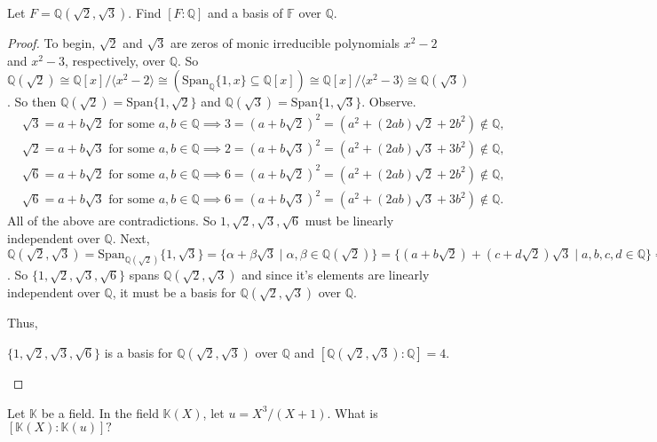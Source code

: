 \documentclass[addpoints,10pt]{exam}
\theoremstyle{plain}
\theoremstyle{definition}
\newtheorem{prob}[thm]{Problem}
\theoremstyle{plain}
\theoremstyle{plain}
\theoremstyle{definition}
\let\oldprob\prob
\let\endoldprob\endprob
\renewenvironment{prob}
  {\begin{singlespace}\oldprob}
  {\endoldprob\end{singlespace}}
\newcommand{\FF}{\ensuremath{\mathbb{F}}}
\newcommand{\KK}{\ensuremath{\mathbb{K}}}
\newcommand{\QQ}{\ensuremath{\mathbb{Q}}}
\begin{document}
\newpage
\begin{prob}
Let $F = \mathbb{Q}(\sqrt{2}, \sqrt{3})$. Find $[F:\mathbb{Q}]$ and a basis of $\FF$ over $\mathbb{Q}$.
\end{prob}

\begin{proof}
To begin, $\sqrt{2}$ and $\sqrt{3}$ are zeros of monic irreducible polynomials $x^{2}-2$ and $x^{2}-3$, respectively, over $\QQ$. So $\QQ(\sqrt{2})\cong \QQ[x]/\langle x^{2}-2\rangle\cong (\mathrm{Span}_{\QQ}\{1,x\}\subseteq \QQ[x]) \cong \QQ[x]/\langle x^{2}-3\rangle \cong \QQ(\sqrt{3})$. So then $\QQ(\sqrt{2})=\mathrm{Span}\{1,\sqrt{2}\}$ and $\QQ(\sqrt{3})=\mathrm{Span}\{1,\sqrt{3}\}$. Observe. 
\begin{align*}
  &\sqrt{3}=a+b\sqrt{2}\text{ for some }a,b\in \QQ \implies 3=(a+b\sqrt{2})^{2}=(a^{2}+(2ab)\sqrt{2}+2b^{2})\not\in \QQ,\\
  &\sqrt{2}=a+b\sqrt{3}\text{ for some }a,b\in \QQ\implies 2=(a+b\sqrt{3})^{2}=(a^{2}+(2ab)\sqrt{3}+3b^{2})\not\in \QQ,\\
  &\sqrt{6}=a+b\sqrt{2}\text{ for some }a,b\in \QQ\implies 6=(a+b\sqrt{2})^{2}=(a^{2}+(2ab)\sqrt{2}+2b^{2})\not\in \QQ,\\
  &\sqrt{6}=a+b\sqrt{3}\text{ for some }a,b\in \QQ\implies 6=(a+b\sqrt{3})^{2}=(a^{2}+(2ab)\sqrt{3}+3b^{2})\not\in \QQ.
\end{align*}
  All of the above are contradictions. So $1,\sqrt{2},\sqrt{3},\sqrt{6}$ must be linearly independent over $\QQ$. Next, $\QQ(\sqrt{2},\sqrt{3})=\mathrm{Span}_{\QQ(\sqrt{2})}\{1,\sqrt{3}\}=\{\alpha+\beta\sqrt{3}\mid \alpha,\beta\in \QQ(\sqrt{2})\}=\{(a+b\sqrt{2})+(c+d\sqrt{2})\sqrt{3}\mid a,b,c,d\in \QQ\}=\{a+b\sqrt{2}+c\sqrt{3}+d\sqrt{6}\mid a,b,c,d\in \QQ\}$. So $\{1,\sqrt{2},\sqrt{3},\sqrt{6}\}$ spans $\QQ(\sqrt{2},\sqrt{3})$ and since it's elements are linearly independent over $\QQ$, it must be a basis for $\QQ(\sqrt{2},\sqrt{3})$ over $\QQ$.

  Thus,
  \begin{center}
    $\{1,\sqrt{2},\sqrt{3},\sqrt{6}\}$ is a basis for $\QQ(\sqrt{2},\sqrt{3})$ over $\QQ$ and $[\QQ(\sqrt{2},\sqrt{3}):\QQ]=4.$
  \end{center}
\end{proof}

\newpage
\begin{prob}
Let $\KK$ be a field. In the field $\KK(X)$, let $u=X^{3}/(X+1)$. What is $[\KK(X):\KK(u)]?$
\end{prob}
\end{document}
